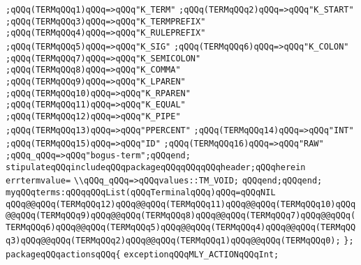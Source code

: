 \verb|;qQQq(TERMqQQq1)qQQq=>qQQq"K_TERM"|\newline
\verb|;qQQq(TERMqQQq2)qQQq=>qQQq"K_START"|\newline
\verb|;qQQq(TERMqQQq3)qQQq=>qQQq"K_TERMPREFIX"|\newline
\verb|;qQQq(TERMqQQq4)qQQq=>qQQq"K_RULEPREFIX"|\newline
\verb|;qQQq(TERMqQQq5)qQQq=>qQQq"K_SIG"|\newline
\verb|;qQQq(TERMqQQq6)qQQq=>qQQq"K_COLON"|\newline
\verb|;qQQq(TERMqQQq7)qQQq=>qQQq"K_SEMICOLON"|\newline
\verb|;qQQq(TERMqQQq8)qQQq=>qQQq"K_COMMA"|\newline
\verb|;qQQq(TERMqQQq9)qQQq=>qQQq"K_LPAREN"|\newline
\verb|;qQQq(TERMqQQq10)qQQq=>qQQq"K_RPAREN"|\newline
\verb|;qQQq(TERMqQQq11)qQQq=>qQQq"K_EQUAL"|\newline
\verb|;qQQq(TERMqQQq12)qQQq=>qQQq"K_PIPE"|\newline
\verb|;qQQq(TERMqQQq13)qQQq=>qQQq"PPERCENT"|\newline
\verb|;qQQq(TERMqQQq14)qQQq=>qQQq"INT"|\newline
\verb|;qQQq(TERMqQQq15)qQQq=>qQQq"ID"|\newline
\verb|;qQQq(TERMqQQq16)qQQq=>qQQq"RAW"|\newline
\verb|;qQQq_qQQq=>qQQq"bogus-term";qQQqend;|\newline
\verb|stipulateqQQqincludeqQQqpackageqQQqqQQqqQQqheader;qQQqherein|\newline
\verb|errtermvalue=|\newline
\verb|\\qQQq_qQQq=>qQQqvalues::TM_VOID;|\newline
\verb|qQQqend;qQQqend;|\newline
\verb|myqQQqterms:qQQqqQQqList(qQQqTerminalqQQq)qQQq=qQQqNIL|\newline
\verb|qQQq@@qQQq(TERMqQQq12)qQQq@@qQQq(TERMqQQq11)qQQq@@qQQq(TERMqQQq10)qQQq@@qQQq(TERMqQQq9)qQQq@@qQQq(TERMqQQq8)qQQq@@qQQq(TERMqQQq7)qQQq@@qQQq(TERMqQQq6)qQQq@@qQQq(TERMqQQq5)qQQq@@qQQq(TERMqQQq4)qQQq@@qQQq(TERMqQQq3)qQQq@@qQQq(TERMqQQq2)qQQq@@qQQq(TERMqQQq1)qQQq@@qQQq(TERMqQQq0);|\newline
\verb|};|\newline
\verb|packageqQQqactionsqQQq{|\newline
\verb|exceptionqQQqMLY_ACTIONqQQqInt;|\newline
